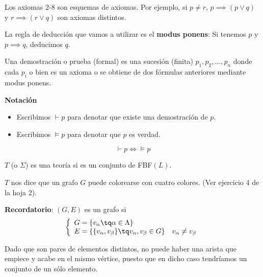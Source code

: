 Los axiomas 2-8 son esquemas de axiomas. Por ejemplo, si $p\neq r$, $p\implies (p\vee q)$ y $r\implies (r\vee q)$ son axiomas distintos.

La regla de deducción que vamos a utilizar es el \textbf{modus ponens}: Si tenemos $p$ y $p\implies q$, deducimos $q$.

\begin{defn}
	Una demostración o prueba (formal) es una sucesión (finita) $p_1, p_2, \hdots, p_n$ donde cada $p_i$ o bien es un axioma o se obtiene de dos fórmulas anteriores mediante modus ponens.
\end{defn}

\begin{mdframed}
\textbf{Notación}
\begin{itemize}
	\vspace{-3mm}
	\item Escribimos $\vdash p$ para denotar que existe una demostración de $p$.
	\item Escribimos $\vDash p$ para denotar que $p$ es verdad.
\end{itemize}
\end{mdframed}

\begin{theorem}
$$\vdash p \iff \vDash p$$
\end{theorem}

\begin{defn}[Teoría]
	$T$ (o $\Sigma$) es una teoría si es un conjunto de FBF$(L)$.
\end{defn}
\begin{example}
	$T$ nos dice que un grafo $G$ puede colorearse con cuatro colores. (Ver ejercicio 4 de la hoja 2).
\end{example}

\noindent \textbf{Recordatorio}: $(G,E)$ es un grafo si
\begin{equation*}
	\left\{
	\begin{array}{l l}
	G=\{v_\alpha \tq \alpha \in \Lambda \} & \\
	E = \left\{\{v_\alpha, v_\beta \}\tq v_\alpha, v_\beta\in G \right\} &  v_\alpha \neq v_\beta
	\end{array}
	\right.
\end{equation*}

Dado que son pares de elementos distintos, no puede haber una arista que empiece y acabe en el mismo vértice, puesto que en dicho caso tendríamos un conjunto de un sólo elemento.

